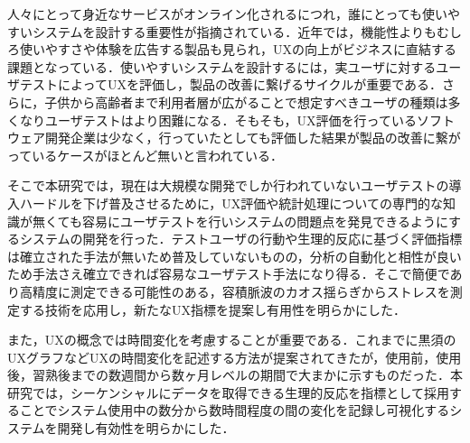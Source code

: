 
\begin{jabstract}


人々にとって身近なサービスがオンライン化されるにつれ，誰にとっても使いやすいシステムを設計する重要性が指摘されている．近年では，機能性よりもむしろ使いやすさや体験を広告する製品も見られ，UXの向上がビジネスに直結する課題となっている．使いやすいシステムを設計するには，実ユーザに対するユーザテストによってUXを評価し，製品の改善に繋げるサイクルが重要である．さらに，子供から高齢者まで利用者層が広がることで想定すべきユーザの種類は多くなりユーザテストはより困難になる．そもそも，UX評価を行っているソフトウェア開発企業は少なく，行っていたとしても評価した結果が製品の改善に繋がっているケースがほとんど無いと言われている．

そこで本研究では，現在は大規模な開発でしか行われていないユーザテストの導入ハードルを下げ普及させるために，UX評価や統計処理についての専門的な知識が無くても容易にユーザテストを行いシステムの問題点を発見できるようにするシステムの開発を行った．テストユーザの行動や生理的反応に基づく評価指標は確立された手法が無いため普及していないものの，分析の自動化と相性が良いため手法さえ確立できれば容易なユーザテスト手法になり得る．そこで簡便であり高精度に測定できる可能性のある，容積脈波のカオス揺らぎからストレスを測定する技術を応用し，新たなUX指標を提案し有用性を明らかにした．

また，UXの概念では時間変化を考慮することが重要である．これまでに黒須のUXグラフなどUXの時間変化を記述する方法が提案されてきたが，使用前，使用後，習熟後までの数週間から数ヶ月レベルの期間で大まかに示すものだった．本研究では，シーケンシャルにデータを取得できる生理的反応を指標として採用することでシステム使用中の数分から数時間程度の間の変化を記録し可視化するシステムを開発し有効性を明らかにした．

\end{jabstract}


